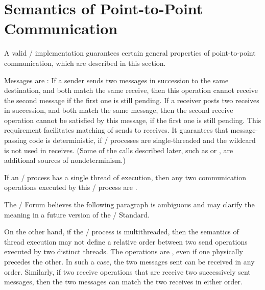 \section{Semantics of Point-to-Point Communication}
\label{sec:pt2pt-semantics}

A valid \MPI/ implementation guarantees certain general properties of
point-to-point communication, which are described in this section.

Messages are :
If a sender sends two messages in succession to the same destination, and
both match the same receive, then this operation cannot receive the
second message if the first one is still pending.
If a receiver posts two receives in succession, and both match the same
message,
then the second receive operation cannot be satisfied by this message, if the
first one is still pending.
This requirement facilitates matching of sends to receives.
It guarantees that message-passing code is deterministic, if \MPI/ processes are
single-threaded and the wildcard  is not used in receives.
(Some of the calls described later, such as  or
, are additional sources of nondeterminism.)

If an \MPI/ process has a single thread of execution, then any two communication operations
executed by this \MPI/ process are .

\begin{users}
The \MPI/ Forum believes the following paragraph is ambiguous and may clarify the meaning in a future version of the \MPI/ Standard.
\end{users}

On the other hand, if the \MPI/ process is
multithreaded, then the semantics of thread execution may not define
a relative order between two send operations executed by two
distinct threads.  The operations are , even if one
physically precedes the other. In such a case, the two messages sent can be
received in any order.  Similarly, if two receive operations that are 
receive two successively sent messages, then the two messages can
match the two receives in either order.

